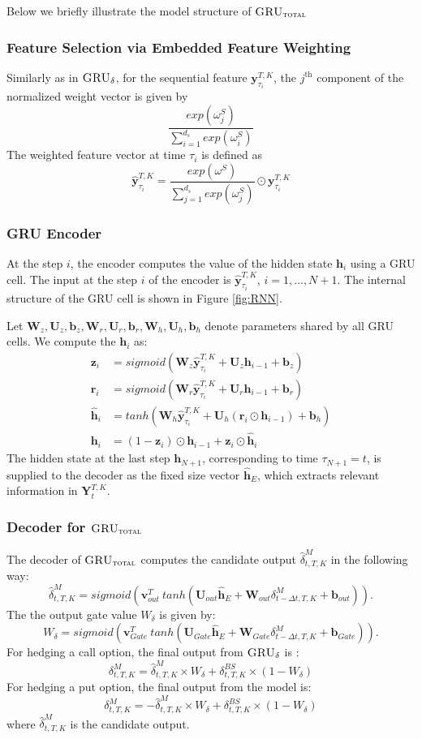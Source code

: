 \documentclass[letterpaper,12pt,titlepage,oneside,final]{book}
\numberwithin{equation}{section}
\theoremstyle{definition}
\newcommand{\model}{\textsc{GRU}_\delta}
\newcommand{\modelT}{\textsc{GRU}_{\textsc{total}}}
\newcommand{\vb}{\mathbf{b}}
\newcommand{\vy}{\mathbf{y}}
\newcommand{\DT}{\Delta t}
\newcommand{\vv}{\mathbf{v}}
\newcommand{\vh}{\mathbf{h}}
\newcommand{\vW}{\pmb{W}}
\newcommand{\vU}{\pmb{U}}
\begin{document}
Below we briefly illustrate the model structure of $\modelT$

\subsubsection{Feature Selection via Embedded Feature Weighting}
Similarly as in $\model$, for the sequential feature $\mathbf{y}_{\tau_i}^{T,K}$,  the $j^\text{th}$ component of the normalized weight vector is given by
\[
\frac{exp(\omega^S_j)}{\sum_{i=1}^{d_s} exp(\omega^S_i)}
\]
The weighted feature vector at time  $\tau_i$ is defined as
\[
\widehat{\vy}_{\tau_i}^{T,K} =\frac{exp(\omega^S)}{\sum_{j=1}^{d_s} exp(\omega^S_j)} \odot \mathbf{y}_{\tau_i}^{T,K}
\]
\subsubsection{GRU Encoder}
At the  step $i$,  the encoder computes the value of the hidden state $\vh_{i}$ using a GRU cell. The input at the step $i$ of the encoder is $\widehat{\vy}^{T,K}_{\tau_{i}}$,  $i=1,\ldots,N+1$.
The internal structure of the GRU cell is shown in Figure \ref{fig:RNN}.

Let  $\vW_z,\vU_z,\vb_z,\vW_r,\vU_r, \vb_r,\vW_h,\vU_h,\vb_h$  denote
parameters shared by all GRU cells. We compute the $\vh_i$ as:
	\[
	\begin{split}
	\mathbf{z}_i&= sigmoid ( \vW_z \widehat{\vy}^{T,K}_{\tau_{i}} + \vU_z \vh_{i-1} +\vb_z)\\
	\mathbf{r}_i&= sigmoid ( \vW_r \widehat{\vy}^{T,K}_{\tau_{i}} + \vU_r \vh_{i-1} +\vb_r)\\
	\widehat{\vh}_i&=tanh( \vW_h \widehat{\vy}^{T,K}_{\tau_{i}}  + \vU_h (\mathbf{r}_i \odot \vh_{i-1}) +\vb_h)\\
	\vh_i&=(1-\mathbf{z}_i) \odot \vh_{i-1} + \mathbf{z}_i \odot \widehat{\vh}_i
	\end{split}
	\]
The hidden state at the last step $\vh_{N+1}$, corresponding to time ${\tau_{N+1}}={t}$, is supplied to
the decoder as the fixed size vector $\mathbf{\widehat{h}}_E$, which  extracts relevant information in $\mathbf{Y}_{t}^{T,K}$.
\subsubsection{Decoder for $\modelT$}
 The decoder of $\modelT$ computes the candidate output  $\widehat{\delta}^M_{t,T,K}$ in the following way:
\[
\widehat{\delta}^M_{t,T,K}=sigmoid (\vv^T_{out} \ tanh( \vU_{out} \mathbf{\widehat{h}}_E + \vW_{out} \delta^M_{t-\DT,T,K}+ \vb_{out})).
\]
The the output gate value $W_{\delta}$ is given by:
\[
W_{\delta}=sigmoid (\vv^T_{Gate} \ tanh( \vU_{Gate} \mathbf{\widehat{h}}_E + \vW_{Gate} \delta^M_{t-\DT,T,K}+ \vb_{Gate})).
\]
For hedging a call option, the final output from $\model$ is :
\[
\delta^M_{t,T,K}=\widehat{\delta}^M_{t,T,K} \times W_{\delta} +\delta^{BS}_{t,T,K} \times (1-W_{\delta})
\]
For hedging a put option, the final output from the model is:
\[
\delta^M_{t,T,K}=-\widehat{\delta}^M_{t,T,K} \times W_{\delta} +\delta^{BS}_{t,T,K} \times (1-W_{\delta})
\]
where $\widehat{\delta}^M_{t,T,K}$ is the candidate output.
\end{document}
